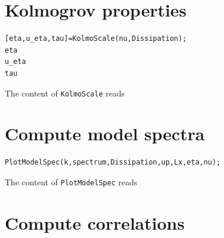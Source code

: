 \documentclass[preprint,12pt,ntfdMod]{elsarticle}
\begin{document}
\section{Kolmogrov properties}

\begin{lstlisting}
[eta,u_eta,tau]=KolmoScale(nu,Dissipation);
eta
u_eta
tau
\end{lstlisting}
\begin{par}

The content of \verb|KolmoScale| reads


\end{par} \vspace{1em}


\section{Compute model spectra}

\begin{lstlisting}
PlotModelSpec(k,spectrum,Dissipation,up,Lx,eta,nu);
\end{lstlisting}
\begin{par}

The content of \verb|PlotModelSpec| reads


\end{par} \vspace{1em}


\section{Compute correlations}
\end{document}
